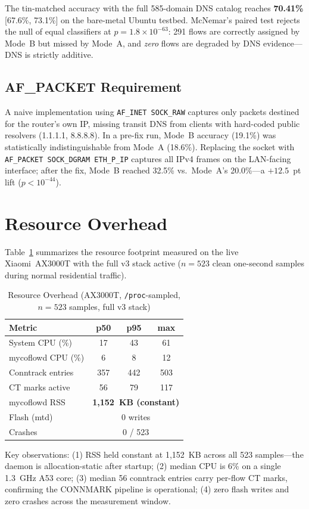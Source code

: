 The tin-matched accuracy with the full 585-domain DNS catalog reaches \textbf{70.41\%} [67.6\%, 73.1\%] on the bare-metal Ubuntu testbed. McNemar's paired test rejects the null of equal classifiers at $p = 1.8{\times}10^{-63}$: 291 flows are correctly assigned by Mode~B but missed by Mode~A, and \emph{zero} flows are degraded by DNS evidence---DNS is strictly additive.

\subsection{AF\_PACKET Requirement}

A naive implementation using \texttt{AF\_INET SOCK\_RAW} captures only packets destined for the router's own IP, missing transit DNS from clients with hard-coded public resolvers (1.1.1.1, 8.8.8.8). In a pre-fix run, Mode~B accuracy (19.1\%) was statistically indistinguishable from Mode~A (18.6\%). Replacing the socket with \texttt{AF\_PACKET SOCK\_DGRAM ETH\_P\_IP} captures all IPv4 frames on the LAN-facing interface; after the fix, Mode~B reached 32.5\% vs.\ Mode~A's 20.0\%---a $+12.5$~pt lift ($p < 10^{-44}$).

\section{Resource Overhead}

Table~\ref{tab:resources} summarizes the resource footprint measured on the live Xiaomi~AX3000T with the full v3 stack active ($n{=}523$ clean one-second samples during normal residential traffic).

\begin{table}[h]
\caption{Resource Overhead (AX3000T, \texttt{/proc}-sampled, $n{=}523$ samples, full v3 stack)}
\label{tab:resources}
\centering
\small
{\setlength{\tabcolsep}{5pt}
\begin{tabular}{l|ccc}
\toprule
\textbf{Metric} & \textbf{p50} & \textbf{p95} & \textbf{max} \\
\midrule
System CPU (\%)      & 17  & 43  & 61  \\
mycoflowd CPU (\%)   & 6   & 8   & 12  \\
Conntrack entries    & 357 & 442 & 503 \\
CT marks active      & 56  & 79  & 117 \\
\midrule
mycoflowd RSS        & \multicolumn{3}{c}{\textbf{1{,}152~KB (constant)}} \\
Flash (mtd)          & \multicolumn{3}{c}{0 writes} \\
Crashes              & \multicolumn{3}{c}{0 / 523} \\
\bottomrule
\end{tabular}}
\end{table}

Key observations: (1) RSS held constant at 1,152~KB across all 523 samples---the daemon is allocation-static after startup; (2) median CPU is 6\% on a single 1.3~GHz A53 core; (3) median 56 conntrack entries carry per-flow CT marks, confirming the CONNMARK pipeline is operational; (4) zero flash writes and zero crashes across the measurement window.
